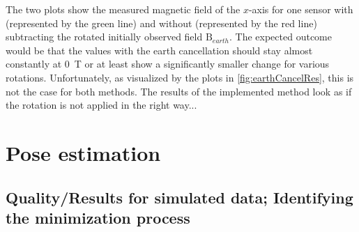 The two plots show the measured magnetic field of the $ x $-axis for one sensor with (represented by the green line) and without (represented by the red line) subtracting the rotated initially observed field $ \mathrm{B}_{earth} $. The expected outcome would be that the values with the earth cancellation should stay almost constantly at \SI{0}{\tesla} or at least show a significantly smaller change for various rotations. Unfortunately, as visualized by the plots in \ref{fig:earthCancelRes}, this is not the case for both methods. The results of the implemented method look as if the rotation is not applied in the right way...



\section{Pose estimation} \label{sec:estimationRes}

\subsection{Quality/Results for simulated data; Identifying the minimization process} \label{subsec:resSim}

